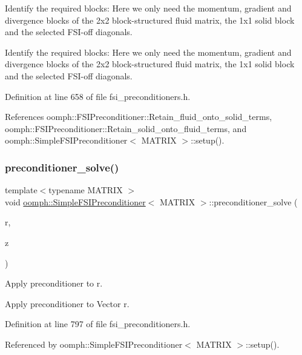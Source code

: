 Identify the required blocks\+: Here we only need the momentum, gradient and divergence blocks of the 2x2 block-\/structured fluid matrix, the 1x1 solid block and the selected F\+S\+I-\/off diagonals. 

Identify the required blocks\+: Here we only need the momentum, gradient and divergence blocks of the 2x2 block-\/structured fluid matrix, the 1x1 solid block and the selected F\+S\+I-\/off diagonals. 

Definition at line 658 of file fsi\+\_\+preconditioners.\+h.



References oomph\+::\+F\+S\+I\+Preconditioner\+::\+Retain\+\_\+fluid\+\_\+onto\+\_\+solid\+\_\+terms, oomph\+::\+F\+S\+I\+Preconditioner\+::\+Retain\+\_\+solid\+\_\+onto\+\_\+fluid\+\_\+terms, and oomph\+::\+Simple\+F\+S\+I\+Preconditioner$<$ M\+A\+T\+R\+I\+X $>$\+::setup().

\mbox{\label{classoomph_1_1SimpleFSIPreconditioner_a31684c26aa10a782189c32304d9d0824}} 
\subsubsection{\texorpdfstring{preconditioner\+\_\+solve()}{preconditioner\_solve()}}
{\footnotesize\ttfamily template$<$typename M\+A\+T\+R\+IX $>$ \\
void \hyperlink{classoomph_1_1SimpleFSIPreconditioner}{oomph\+::\+Simple\+F\+S\+I\+Preconditioner}$<$ M\+A\+T\+R\+IX $>$\+::preconditioner\+\_\+solve (\begin{DoxyParamCaption}\item[{const Double\+Vector \&}]{r,  }\item[{Double\+Vector \&}]{z }\end{DoxyParamCaption})}



Apply preconditioner to r. 

Apply preconditioner to Vector r. 

Definition at line 797 of file fsi\+\_\+preconditioners.\+h.



Referenced by oomph\+::\+Simple\+F\+S\+I\+Preconditioner$<$ M\+A\+T\+R\+I\+X $>$\+::setup().

